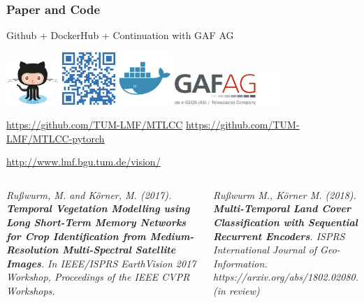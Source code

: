 \begin{frame}[c]
\frametitle{Paper and Code}
\centering 


\large



Github + DockerHub + Continuation with GAF AG

\vspace{1ex}

\includegraphics[width=2cm]{images/github} \hspace{.5ex}
\includegraphics[width=2cm]{images/qr_github} \hspace{.5ex}
\includegraphics[width=2cm]{images/docker} \hspace{.5ex}
\vline
\hspace{.5ex}
\includegraphics[width=4cm]{images/gaf}

\vspace{1ex}

\url{https://github.com/TUM-LMF/MTLCC}
\url{https://github.com/TUM-LMF/MTLCC-pytorch}

\url{http://www.lmf.bgu.tum.de/vision/}

\vspace{1em}
\begin{columns}[t]
	\scriptsize
	\textsl{
		Rußwurm, M. and Körner, M. (2017). \textbf{Temporal Vegetation Modelling using Long Short-Term Memory Networks for Crop Identification from Medium-Resolution Multi-Spectral Satellite Images}. In IEEE/ISPRS EarthVision 2017 Workshop, Proceedings of the IEEE CVPR Workshops.
	}
	
	\small
	\textsl{
		Rußwurm M., Körner M. (2018). \textbf{Multi-Temporal Land Cover Classification with Sequential Recurrent Encoders}. ISPRS International Journal of Geo-Information. https://arxiv.org/abs/1802.02080. (in review)
	}
	
\end{columns}


\end{frame}

